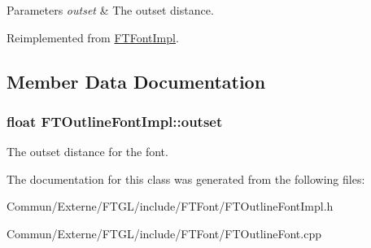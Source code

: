 \begin{DoxyParams}{Parameters}
{\em outset} & The outset distance. \\
\hline
\end{DoxyParams}


Reimplemented from \hyperlink{class_f_t_font_impl}{F\+T\+Font\+Impl}.



\subsection{Member Data Documentation}
\subsubsection[{\texorpdfstring{outset}{outset}}]{\setlength{\rightskip}{0pt plus 5cm}float F\+T\+Outline\+Font\+Impl\+::outset\hspace{0.3cm}{\ttfamily [private]}}\hypertarget{class_f_t_outline_font_impl_aee33d8b179d95de04ff4244943413377}{}\label{class_f_t_outline_font_impl_aee33d8b179d95de04ff4244943413377}
The outset distance for the font. 

The documentation for this class was generated from the following files\+:\begin{DoxyCompactItemize}
\item 
Commun/\+Externe/\+F\+T\+G\+L/include/\+F\+T\+Font/F\+T\+Outline\+Font\+Impl.\+h\item 
Commun/\+Externe/\+F\+T\+G\+L/include/\+F\+T\+Font/F\+T\+Outline\+Font.\+cpp\end{DoxyCompactItemize}
